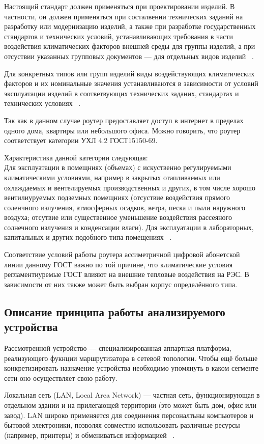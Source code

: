 Настоящий стандарт должен применяться при проектировании изделий.  В
частности, он должен применяться при состалвении технических заданий
на разработку или модернизацию изделий, а также при разработке
государственных стандартов и технических условий, устанавливающих
требования в части воздействия климатических факторов внешней среды
для группы изделий, а при отсуствии указанных групповых документов —
для отдельных видов изделий ~\cite{GOST-15150-69}.

Для конкретных типов или групп изделий виды воздействующих
климатических факторов и их номинальные значения устанавливаются в
зависимости от условий эксплуатации изделий в соответвующих
технических заданих, стандартах и технических условиях ~\cite{GOST-15150-69}.

Так как в данном случае роутер предоставляет доступ в интернет в
пределах одного дома, квартиры или небольшого офиса. Можно говорить, что роутер соответствует категории УХЛ 4.2 ГОСТ15150-69.

Характеристика данной категории следующая:\\
Для эксплуатации в помещниях (объемах) с искуственно регулируемыми
климатическими условиями, например в закрытых отапливаемых или
охлаждаемых и вентелируемых производственных и других, в том числе
хорошо вентилиуруемых подземных помещниях (отсуствие воздействия
прямого соленчного излучения, атмосферных осадков, ветра, песка и пыли
наружного воздуха; отсутвие или существенное уменьшение воздействия
рассеяного солнечного излучения и конденсации влаги). Для эксплуатации
в лабораторных, капитальных и других подобного типа помещениях ~\cite{GOST-15150-69}.

Соответствие условий работы роутера ассиметричной цифровой абонетской
линии данному ГОСТ важно по той причине, что климатические условия
регламентиуремые ГОСТ влияют на внешние тепловые воздействия на РЭС.
В зависимости от них также может быть выбран корпус определённого
типа.

\subsection{Описание принципа работы анализируемого устройства}


Рассмотренной устройство — специализированная аппартная платформа,
реализующего фукнции маршрутизатора в сетевой топологии.  Чтобы ещё
больше конкретизировать назначение устройства необходимо упомянуть в
каком сегменте сети оно осуществляет свою работу.


Локальная сеть (LAN, Local Area Network) — частная сеть,
функционирующая в отдельном здании и на прилегающей территории
(это может быть дом, офис или завод). LAN широко применяется для соединения персоналтьны компьютеров и бытовой электроники, позволяя совместно
использовать различные ресурсы (например, принтеры) и обмениваться
информацией ~\cite{NetworksTanenbaum2023}.

